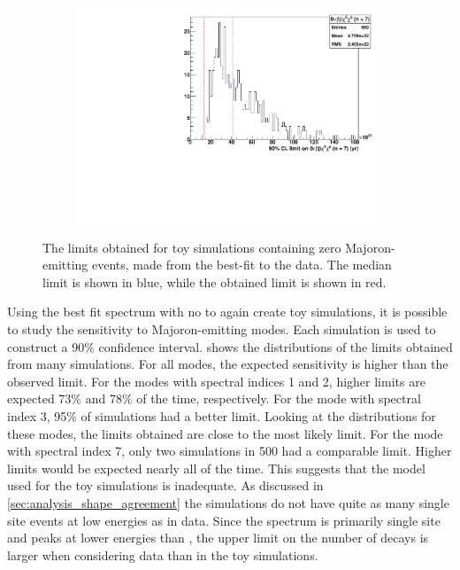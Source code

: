 \documentclass[herrin-thesis.tex]{subfiles}
\begin{document}
\begin{figure}[tbp]
\begin{subfigure}[c]{0.48\textwidth}
	\end{subfigure}\hfill%
	\begin{subfigure}[c]{0.48\textwidth}
	\centering
	\includegraphics[width=\textwidth]{./plots/analysis_bb0nX7_sensitivity.pdf}
	\end{subfigure}
\caption[Sensitivity studies for \(0\nu\beta\beta\chi^0(\chi^0)\)]{The limits obtained for toy simulations containing zero Majoron-emitting events, made from the best-fit to the data. The median limit is shown in blue, while the obtained limit is shown in red.}
\label{fig:analysis_bb0nX_sensitivity}
\end{figure}

Using the best fit spectrum with no \zeronuXpX{} to again create toy simulations, it is possible to study the sensitivity to Majoron-emitting modes. Each simulation is used to construct a 90\% confidence interval.  shows the distributions of the limits obtained from many simulations. For all modes, the expected sensitivity is higher than the observed limit. For the modes with spectral indices 1 and 2, higher limits are expected 73\% and 78\% of the time, respectively. For the mode with spectral index 3, 95\% of simulations had a better limit. Looking at the distributions for these modes, the limits obtained are close to the most likely limit. For the mode with spectral index 7, only two simulations in 500 had a comparable limit. Higher limits would be expected nearly all of the time. This suggests that the model used for the toy simulations is inadequate. As discussed in \cref{sec:analysis_shape_agreement} the simulations do not have quite as many single site events at low energies as in data. Since the \zeronuXX{} spectrum is primarily single site and peaks at lower energies than \twonu{}, the upper limit on the number of decays is larger when considering data than in the toy simulations.
\end{document}
